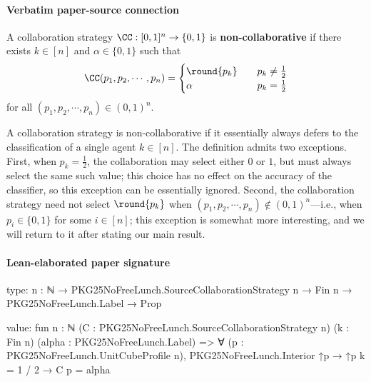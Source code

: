 \documentclass[10pt]{article}
\begin{document}
\paragraph{Verbatim paper-source connection}
\begin{ReviewVerbatim}
\begin{definition}\label{def:non-collaborative}
    A collaboration strategy $\CC:[0,1]^n\rightarrow \{0,1\}$ is \textbf{non-collaborative} if there exists $k\in [n]$ and $\alpha\in \{0,1\}$ such that
    \begin{equation}
    \CC(p_1,p_2,\cdots,p_n) =
        \begin{cases}
        \round{p_k} &\quad \text{$p_k\neq \frac{1}{2}$} \\
            \alpha &\quad \text{$p_k=\frac{1}{2}$}
        \end{cases}
    \end{equation}
    for all $(p_1,p_2,\cdots,p_n)\in (0,1)^n$.
\end{definition}

A collaboration strategy is non-collaborative if it essentially always defers to the classification of a single agent $k\in [n]$. The definition admits two exceptions. First, when $p_k = \frac{1}{2}$, the collaboration may select either $0$ or $1$, but must always select the same such value; this choice has no effect on the accuracy of the classifier, so this exception can be essentially ignored. Second, the collaboration strategy need not select $\round{p_k}$ when $(p_1,p_2,\cdots,p_n)\notin (0,1)^n$---i.e., when $p_i\in \{0,1\}$ for some $i\in [n]$; this exception is somewhat more interesting, and we will return to it after stating our main result.
\end{ReviewVerbatim}



\paragraph{Lean-elaborated paper signature}
\begin{ReviewVerbatim}
type:
{n : ℕ} → PKG25NoFreeLunch.SourceCollaborationStrategy n → Fin n → PKG25NoFreeLunch.Label → Prop

value:
fun {n : ℕ} (C : PKG25NoFreeLunch.SourceCollaborationStrategy n) (k : Fin n) (alpha : PKG25NoFreeLunch.Label) =>
  ∀ (p : PKG25NoFreeLunch.UnitCubeProfile n), PKG25NoFreeLunch.Interior ↑p → ↑p k = 1 / 2 → C p = alpha
\end{ReviewVerbatim}
\end{document}
